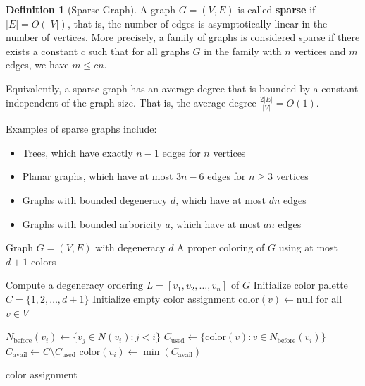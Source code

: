 \documentclass{article}
\theoremstyle{definition}
\newtheorem{definition}{Definition}
\begin{document}
\begin{definition}[Sparse Graph]
A graph $G = (V, E)$ is called \textbf{sparse} if $|E| = O(|V|)$, that is, the number of edges is asymptotically linear in the number of vertices. More precisely, a family of graphs is considered sparse if there exists a constant $c$ such that for all graphs $G$ in the family with $n$ vertices and $m$ edges, we have $m \leq cn$.

Equivalently, a sparse graph has an average degree that is bounded by a constant independent of the graph size. That is, the average degree $\frac{2|E|}{|V|} = O(1)$.

Examples of sparse graphs include:
\begin{itemize}
    \item Trees, which have exactly $n-1$ edges for $n$ vertices
    \item Planar graphs, which have at most $3n-6$ edges for $n \geq 3$ vertices
    \item Graphs with bounded degeneracy $d$, which have at most $dn$ edges
    \item Graphs with bounded arboricity $a$, which have at most $an$ edges
\end{itemize}
\end{definition}

\begin{algorithm}
\caption{Coloring Algorithm for Sparse Graphs}
\label{alg:sparse-graph-coloring}
\begin{algorithmic}[1]
    \Require Graph $G = (V, E)$ with degeneracy $d$
    \Ensure A proper coloring of $G$ using at most $d+1$ colors
    
    \State Compute a degeneracy ordering $L = [v_1, v_2, \ldots, v_n]$ of $G$
    \State Initialize color palette $C = \{1, 2, \ldots, d+1\}$
    \State Initialize empty color assignment $\text{color}(v) \gets \text{null}$ for all $v \in V$
    
        \State $N_{\text{before}}(v_i) \gets \{v_j \in N(v_i) : j < i\}$ 
        \State $C_{\text{used}} \gets \{\text{color}(v) : v \in N_{\text{before}}(v_i)\}$ 
        \State $C_{\text{avail}} \gets C \setminus C_{\text{used}}$ 
        \State $\text{color}(v_i) \gets \min(C_{\text{avail}})$ 
    \EndFor
    
    \State \Return $\text{color}$ assignment
\end{algorithmic}
\end{algorithm}
\end{document}
